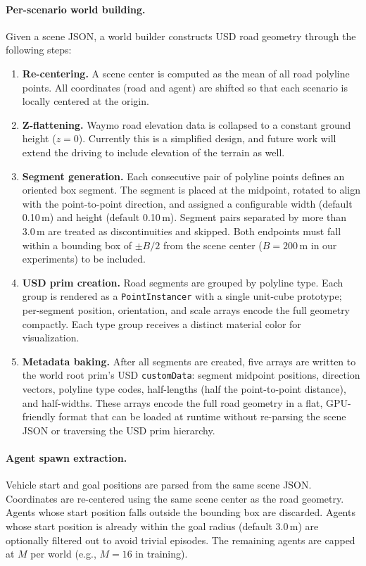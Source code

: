 \paragraph{Per-scenario world building.}
Given a scene JSON, a world builder constructs USD road geometry through the following steps:
\begin{enumerate}[leftmargin=*, itemsep=1pt]
  \item \textbf{Re-centering.}
  A scene center is computed as the mean of all road polyline points.
  All coordinates (road and agent) are shifted so that each scenario is locally centered at the origin.

  \item \textbf{Z-flattening.}
  Waymo road elevation data is collapsed to a constant ground height ($z=0$). Currently this is a simplified design, and future work will extend the driving to include elevation of the terrain as well.

  \item \textbf{Segment generation.}
  Each consecutive pair of polyline points defines an oriented box segment.
  The segment is placed at the midpoint, rotated to align with the point-to-point direction, and assigned a configurable width (default 0.10\,m) and height (default 0.10\,m).
  Segment pairs separated by more than 3.0\,m are treated as discontinuities and skipped.
  Both endpoints must fall within a bounding box of $\pm B/2$ from the scene center ($B=200$\,m in our experiments) to be included.

  \item \textbf{USD prim creation.}
  Road segments are grouped by polyline type.
  Each group is rendered as a \texttt{PointInstancer} with a single unit-cube prototype; per-segment position, orientation, and scale arrays encode the full geometry compactly.
  Each type group receives a distinct material color for visualization.

  \item \textbf{Metadata baking.}
  After all segments are created, five arrays are written to the world root prim's USD \texttt{customData}: segment midpoint positions, direction vectors, polyline type codes, half-lengths (half the point-to-point distance), and half-widths.
  These arrays encode the full road geometry in a flat, GPU-friendly format that can be loaded at runtime without re-parsing the scene JSON or traversing the USD prim hierarchy.
\end{enumerate}

\paragraph{Agent spawn extraction.}
Vehicle start and goal positions are parsed from the same scene JSON.
Coordinates are re-centered using the same scene center as the road geometry.
Agents whose start position falls outside the bounding box are discarded.
Agents whose start position is already within the goal radius (default 3.0\,m) are optionally filtered out to avoid trivial episodes.
The remaining agents are capped at $M$ per world (e.g., $M{=}16$ in training).


